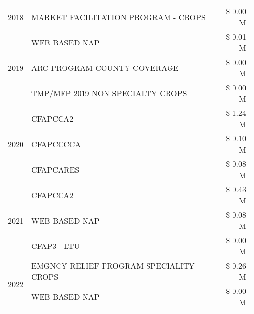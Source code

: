 \begin{tabular}{llr}
\cline{1-3}
2018 & MARKET FACILITATION PROGRAM - CROPS & \$ 0.00 M \\
\cline{1-3}
\multirow[t]{3}{*}{2019} & WEB-BASED NAP & \$ 0.01 M \\
 & ARC PROGRAM-COUNTY COVERAGE & \$ 0.00 M \\
 & TMP/MFP 2019 NON SPECIALTY CROPS & \$ 0.00 M \\
\cline{1-3}
\multirow[t]{3}{*}{2020} & CFAPCCA2 & \$ 1.24 M \\
 & CFAPCCCCA & \$ 0.10 M \\
 & CFAPCARES & \$ 0.08 M \\
\cline{1-3}
\multirow[t]{3}{*}{2021} & CFAPCCA2 & \$ 0.43 M \\
 & WEB-BASED NAP & \$ 0.08 M \\
 & CFAP3 - LTU & \$ 0.00 M \\
\cline{1-3}
\multirow[t]{2}{*}{2022} & EMGNCY RELIEF PROGRAM-SPECIALITY CROPS & \$ 0.26 M \\
 & WEB-BASED NAP & \$ 0.00 M \\
\cline{1-3}
\bottomrule
\end{tabular}
